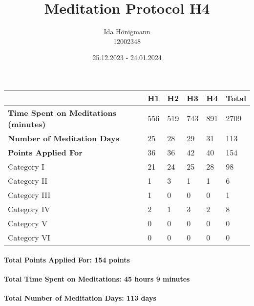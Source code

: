 \documentclass[11pt,a4paper]{article}
\begin{document}
\afterpage{\restorepagecolor}
\title{\LARGE\bfseries Meditation Protocol H4}
\author{Ida Hönigmann \\ 12002348}
\date{25.12.2023 - 24.01.2024}
\maketitle

\begin{tabular}{l|l|l|l|l|l}
	                                             &\textbf{H1}&\textbf{H2}&\textbf{H3}&\textbf{H4}&\textbf{Total}\\
	\hline
	\textbf{Time Spent on Meditations (minutes)} &556        &519        &743        &891        &2709          \\
	\textbf{Number of Meditation Days}           &25         &28         &29         &31         &113           \\
	\textbf{Points Applied For}                  &36         &36         &42         &40         &154           \\
	\hline
	Category I                                   &21         &24         &25         &28         &98            \\
	Category II                                  &1          &3          &1          &1          &6             \\
	Category III                                 &1          &0          &0          &0          &1             \\
	Category IV                                  &2          &1          &3          &2          &8             \\
	Category V                                   &0          &0          &0          &0          &0             \\
	Category VI                                  &0          &0          &0          &0          &0             \\
\end{tabular}

\paragraph{Total Points Applied For: 154 points}
\paragraph{Total Time Spent on Meditations: 45 hours 9 minutes}
\paragraph{Total Number of Meditation Days: 113 days}
\end{document}
